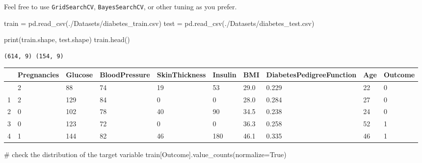 \documentclass[
  letterpaper,
  DIV=11,
  numbers=noendperiod]{scrreprt}
\newenvironment{Shaded}{\begin{snugshade}}{\end{snugshade}}
\newcommand{\BuiltInTok}[1]{\textcolor[rgb]{0.00,0.23,0.31}{#1}}
\newcommand{\CommentTok}[1]{\textcolor[rgb]{0.37,0.37,0.37}{#1}}
\newcommand{\NormalTok}[1]{\textcolor[rgb]{0.00,0.23,0.31}{#1}}
\newcommand{\OperatorTok}[1]{\textcolor[rgb]{0.37,0.37,0.37}{#1}}
\newcommand{\StringTok}[1]{\textcolor[rgb]{0.13,0.47,0.30}{#1}}
\newcommand{\VariableTok}[1]{\textcolor[rgb]{0.07,0.07,0.07}{#1}}
\begin{document}
Feel free to use \texttt{GridSearchCV}, \texttt{BayesSearchCV}, or other
tuning as you prefer.

\begin{Shaded}
\begin{Highlighting}[]
\NormalTok{train }\OperatorTok{=}\NormalTok{ pd.read\_csv(}\StringTok{\textquotesingle{}./Datasets/diabetes\_train.csv\textquotesingle{}}\NormalTok{)}
\NormalTok{test }\OperatorTok{=}\NormalTok{ pd.read\_csv(}\StringTok{\textquotesingle{}./Datasets/diabetes\_test.csv\textquotesingle{}}\NormalTok{)}
\end{Highlighting}
\end{Shaded}

\begin{Shaded}
\begin{Highlighting}[]
\BuiltInTok{print}\NormalTok{(train.shape, test.shape)}
\NormalTok{train.head()}
\end{Highlighting}
\end{Shaded}

\begin{verbatim}
(614, 9) (154, 9)
\end{verbatim}

\begin{longtable}[]{@{}llllllllll@{}}
\toprule\noalign{}
& Pregnancies & Glucose & BloodPressure & SkinThickness & Insulin & BMI
& DiabetesPedigreeFunction & Age & Outcome \\
\midrule\noalign{}
\endhead
\bottomrule\noalign{}
\endlastfoot
0 & 2 & 88 & 74 & 19 & 53 & 29.0 & 0.229 & 22 & 0 \\
1 & 2 & 129 & 84 & 0 & 0 & 28.0 & 0.284 & 27 & 0 \\
2 & 0 & 102 & 78 & 40 & 90 & 34.5 & 0.238 & 24 & 0 \\
3 & 0 & 123 & 72 & 0 & 0 & 36.3 & 0.258 & 52 & 1 \\
4 & 1 & 144 & 82 & 46 & 180 & 46.1 & 0.335 & 46 & 1 \\
\end{longtable}

\begin{Shaded}
\begin{Highlighting}[]
\CommentTok{\# check the distribution of the target variable}
\NormalTok{train[}\StringTok{\textquotesingle{}Outcome\textquotesingle{}}\NormalTok{].value\_counts(normalize}\OperatorTok{=}\VariableTok{True}\NormalTok{)}
\end{Highlighting}
\end{Shaded}
\end{document}
